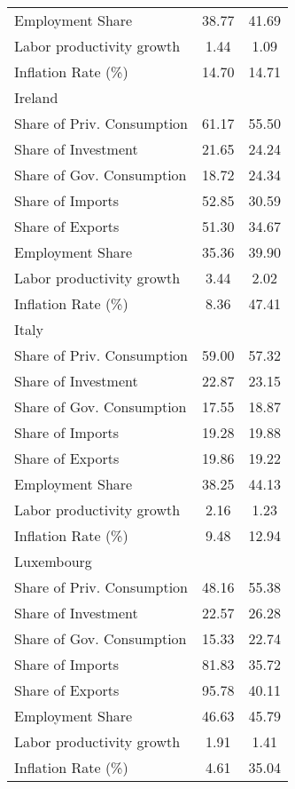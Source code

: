 \begin{center}
\begin{longtable}{lcc}
Employment Share &     38.77 &     41.69 \\  
Labor productivity growth &      1.44 &      1.09 \\  
Inflation Rate (\%) &     14.70 &     14.71 \\  
Ireland &  &  \\  
Share of Priv. Consumption &     61.17 &     55.50 \\  
Share of Investment &     21.65 &     24.24 \\  
Share of Gov. Consumption &     18.72 &     24.34 \\  
Share of Imports &     52.85 &     30.59 \\  
Share of Exports &     51.30 &     34.67 \\  
Employment Share &     35.36 &     39.90 \\  
Labor productivity growth &      3.44 &      2.02 \\  
Inflation Rate (\%) &      8.36 &     47.41 \\  
Italy &  &  \\  
Share of Priv. Consumption &     59.00 &     57.32 \\  
Share of Investment &     22.87 &     23.15 \\  
Share of Gov. Consumption &     17.55 &     18.87 \\  
Share of Imports &     19.28 &     19.88 \\  
Share of Exports &     19.86 &     19.22 \\  
Employment Share &     38.25 &     44.13 \\  
Labor productivity growth &      2.16 &      1.23 \\  
Inflation Rate (\%) &      9.48 &     12.94 \\  
Luxembourg &  &  \\  
Share of Priv. Consumption &     48.16 &     55.38 \\  
Share of Investment &     22.57 &     26.28 \\  
Share of Gov. Consumption &     15.33 &     22.74 \\  
Share of Imports &     81.83 &     35.72 \\  
Share of Exports &     95.78 &     40.11 \\  
Employment Share &     46.63 &     45.79 \\  
Labor productivity growth &      1.91 &      1.41 \\  
Inflation Rate (\%) &      4.61 &     35.04 \\  

\end{longtable}
\end{center}
